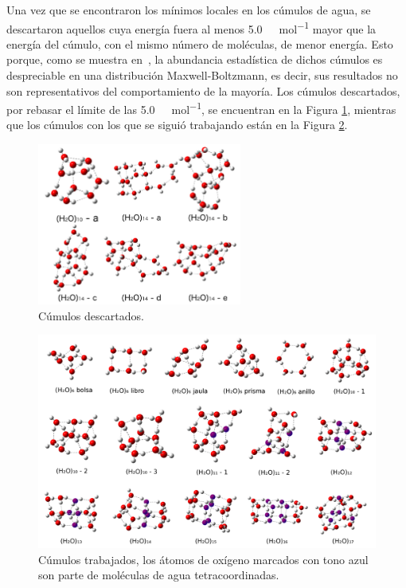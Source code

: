 Una vez que se encontraron los mínimos locales en los cúmulos de agua, se
descartaron aquellos cuya energía fuera al menos \SI{5.0}{\kilo \calorie \per
\mole} mayor que la energía del cúmulo, con el mismo número de moléculas, de
menor energía. Esto porque, como se muestra en~, la abundancia
estadística de dichos cúmulos es despreciable en una distribución
Maxwell-Boltzmann, es decir, sus resultados no son representativos del
comportamiento de la mayoría. Los cúmulos descartados, por rebasar el límite de
las \SI{5.0}{\kilo \calorie \per \mole}, se encuentran en la Figura
\ref{descartados}, mientras que los cúmulos con los que se siguió trabajando
están en la Figura \ref{cumulos}.

\begin{figure}
    \centering
    \includegraphics[width=0.60\textwidth]{4/img/descartados}
    \caption{Cúmulos descartados.}
\label{descartados}
\end{figure}
%
\begin{figure}
    \centering
    \includegraphics[width=1.00\textwidth]{4/img/cumulos}
    \caption{Cúmulos trabajados, los átomos de oxígeno marcados con tono azul
son parte de moléculas de agua tetracoordinadas.}
\label{cumulos}
\end{figure}

